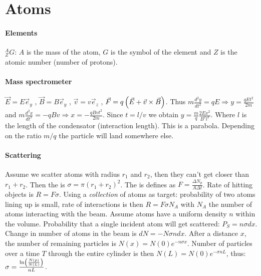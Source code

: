 \section{Atoms}

\paragraph{Elements}
${^A_Z}G$: $A$ is the mass of the atom, $G$ is the symbol of the element and $Z$
is the atomic number (number of protons).

\paragraph{Mass spectrometer}
$\vec{E} = E \vec{e}_y$ , $\vec{B} = B \vec{e}_y$ , $\vec{v} = v \vec{e}_z$ ,
$\vec{F} = q \left( \vec{E} + \vec{v} \times \vec{B} \right)$. Thus
$m \frac{d^2 y}{d t^2} = q E \Rightarrow y = \frac{q E t^2}{2 m}$ and
$m \frac{d^2 x}{d t^2} = - q B v \Rightarrow x = - \frac{q B v t^2}{2 m}$.
Since $t = l/v$ we obtain $y = \frac{m}{q} \frac{2 E x^2}{B^2 l^2}$. Where $l$ is
the length of the condensator (interaction length). This is a parabola. Depending
on the ratio $m/q$ the particle will land somewhere else.

\paragraph{Scattering}
Assume we scatter atoms with radius $r_1$ and $r_2$, then they can't get
closer than $r_1 + r_2$. Then the  is
$\sigma = \pi (r_1 + r_2)^2$. The  is defines as
$F = \frac{\Delta N_p}{A \Delta t}$. Rate of hitting objects is
$R = F \sigma$. Using a \textit{collection} of atoms as target:
probability of two atoms lining up is small, rate of interactions is then
$R = F \sigma N_A$ with $N_A$ the number of atoms interacting with the beam.
Assume atoms have a uniform density $n$ within the volume. Probability that
a single incident atom will get scattered: $P_S = n \sigma d x$.
Change in number of atoms in the beam is $d N = - N \sigma n dx$. After a
distance $x$, the number of remaining particles is $N(x) = N(0) e^{-n \sigma x}$.
Number of particles over a time $T$ through the entire cylinder is then
$N(L) = N(0) e^{- \sigma n L}$, thus: $\sigma = \frac{\ln \left( \frac{N(p)}{N(L)} \right)}{n L}$.

